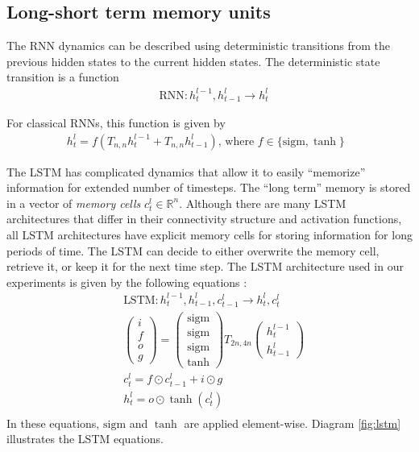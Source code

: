 \documentclass{article}
\begin{document}
\subsection{Long-short term memory units}
\label{sec:lstm}

The RNN dynamics can be described using deterministic transitions
from the previous hidden states to the current hidden states. 
The deterministic state transition is a function
\begin{align*}
  &\text{RNN} : h^{l-1}_t, h^l_{t-1} \rightarrow h^l_t
\end{align*}

For classical RNNs, this function is given by
\begin{align*}
  h^l_t = f(T_{n,n}h^{l-1}_t + T_{n,n}h^l_{t-1}) \text{, where $f \in \{\mathrm{sigm}, \tanh\}$ }
\end{align*}

The LSTM has complicated dynamics that allow it to
easily ``memorize'' information for extended number of timesteps.  The
``long term'' memory is stored in a vector of \emph{memory cells}
$c^l_t \in \mathbb{R}^n$.  Although there are many LSTM architectures
that differ in their connectivity structure and activation functions,
all LSTM architectures have explicit memory cells for storing
information for long periods of time.  The LSTM can decide
to either overwrite the memory cell, retrieve it, or keep it for the next time
step.  The LSTM architecture used in our experiments is given by the
following equations \cite{graves2013speech}:
\begin{align*}
&\text{LSTM} : h^{l-1}_t, h^l_{t-1}, c^l_{t - 1} \rightarrow h^l_t, c^l_t\\
&\begin{pmatrix}i\\f\\o\\g\end{pmatrix} =
  \begin{pmatrix}\mathrm{sigm}\\\mathrm{sigm}\\\mathrm{sigm}\\\tanh\end{pmatrix}
  T_{2n,4n}\begin{pmatrix}h^{l - 1}_t\\h^l_{t-1}\end{pmatrix}\\
&c^l_t = f \odot c^l_{t-1} + i \odot g\\
&h^l_t = o \odot \tanh(c^l_t)\\
\end{align*}
In these equations, $\mathrm{sigm}$ and $\tanh$ are applied
element-wise. Diagram \ref{fig:lstm} illustrates the LSTM
equations.
\end{document}
